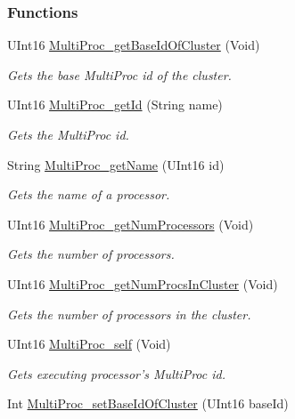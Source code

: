 \subsubsection*{Functions}
\begin{DoxyCompactItemize}
\item 
U\-Int16 \hyperlink{_multi_proc_8h_a147f37c02626ab600bea516211eac50e}{Multi\-Proc\-\_\-get\-Base\-Id\-Of\-Cluster} (Void)
\begin{DoxyCompactList}\small\item\em Gets the base Multi\-Proc id of the cluster. \end{DoxyCompactList}\item 
U\-Int16 \hyperlink{_multi_proc_8h_ad690d4b42978e95cb57d9244bb8e6959}{Multi\-Proc\-\_\-get\-Id} (String name)
\begin{DoxyCompactList}\small\item\em Gets the Multi\-Proc id. \end{DoxyCompactList}\item 
String \hyperlink{_multi_proc_8h_aa16e1bb4fd1eb6f968d6ba47c65f88e0}{Multi\-Proc\-\_\-get\-Name} (U\-Int16 id)
\begin{DoxyCompactList}\small\item\em Gets the name of a processor. \end{DoxyCompactList}\item 
U\-Int16 \hyperlink{_multi_proc_8h_a75e5d953ef6828ef03c2eb8d70dda82d}{Multi\-Proc\-\_\-get\-Num\-Processors} (Void)
\begin{DoxyCompactList}\small\item\em Gets the number of processors. \end{DoxyCompactList}\item 
U\-Int16 \hyperlink{_multi_proc_8h_a74dfbb6a7dbf74b2a9be6c041a13d8bd}{Multi\-Proc\-\_\-get\-Num\-Procs\-In\-Cluster} (Void)
\begin{DoxyCompactList}\small\item\em Gets the number of processors in the cluster. \end{DoxyCompactList}\item 
U\-Int16 \hyperlink{_multi_proc_8h_a2cb11a79ed2c6cbd6ea6b88b63903124}{Multi\-Proc\-\_\-self} (Void)
\begin{DoxyCompactList}\small\item\em Gets executing processor's Multi\-Proc id. \end{DoxyCompactList}\item 
Int \hyperlink{_multi_proc_8h_ae8ca0f1d758d428d9f06f56badee7f0c}{Multi\-Proc\-\_\-set\-Base\-Id\-Of\-Cluster} (U\-Int16 base\-Id)

\end{DoxyCompactItemize}
